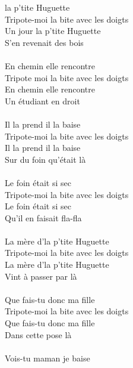 
 la p'tite Huguette
\\Tripote-moi la bite avec les doigts
\\Un jour la p'tite Huguette
\\S'en revenait des bois ~~~~~~~~~~~~~~~~~~\bissimplemple
\\\\En chemin elle rencontre
\\Tripote moi la bite avec les doigts
\\En chemin elle rencontre
\\Un étudiant en droit ~~~~~~~~~~~~~~~~~~\bissimplemple
\\\\Il la prend il la baise
\\Tripote-moi la bite avec les doigts
\\Il la prend il la baise
\\Sur du foin qu'était là ~~~~~~~~~~~~~~~~\bissimplemple
\\\\Le foin était si sec
\\Tripote-moi la bite avec les doigts
\\Le foin était si sec
\\Qu'il en faisait fla-fla ~~~~~~~~~~~~~~~~~\bissimplemple
\\\\La mère d'la p'tite Huguette
\\Tripote-moi la bite avec les doigts
\\La mère d'la p'tite Huguette
\\Vint à passer par là ~~~~~~~~~~~~~~~~~~~\bissimplemple
\\\\Que fais-tu donc ma fille
\\Tripote-moi la bite avec les doigts
\\Que fais-tu donc ma fille
\\Dans cette pose là ~~~~~~~~~~~~~~~~~~~~~\bissimplemple
\\\\Vois-tu maman je baise

